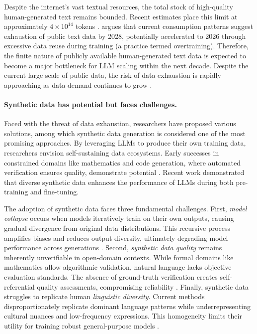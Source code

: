 Despite the internet's vast textual resources, the total stock of high-quality human-generated text remains bounded. Recent estimates place this limit at approximately {$4\times 10^{14}$ tokens} \cite{villalobos2022trends}. \citet{villalobos2024will} argues that current consumption patterns suggest exhaustion of public text data by 2028, potentially accelerated to 2026 through excessive data reuse during training (a practice termed {overtraining}). 
Therefore, the finite nature of publicly available human-generated text data is expected to become a major bottleneck for LLM scaling within the next decade. Despite the current large scale of public data, the risk of data exhaustion is rapidly approaching as data demand continues to grow \cite{sevilla2022compute}.

\paragraph{Synthetic data has potential but faces challenges.}
Faced with the threat of data exhaustion, researchers have proposed various solutions, among which synthetic data generation is considered one of the most promising approaches. 
By leveraging LLMs to produce their own training data, researchers envision {self-sustaining data ecosystems}. Early successes in constrained domains like mathematics and code generation, where automated verification ensures quality, demonstrate potential \cite{liu2023tinygsm}.  Recent work \cite{chen2024diversity} demonstrated that diverse synthetic data enhances the performance of LLMs during both pre-training and fine-tuning.


The adoption of synthetic data faces three fundamental challenges. First, \textit{model collapse} occurs when models iteratively train on their own outputs, causing gradual divergence from original data distributions. This recursive process amplifies biases and reduces output diversity, ultimately degrading model performance across generations \cite{shumailov2023curse,dohmatob2024strong}. 
Second, \textit{synthetic data quality} remains inherently unverifiable in open-domain contexts. While formal domains like mathematics allow algorithmic validation, natural language lacks objective evaluation standards. The absence of ground-truth verification creates self-referential quality assessments, compromising reliability \cite{alemohammad2023self,wenger2024ai}.
Finally, synthetic data struggles to replicate human \textit{linguistic diversity}. Current methods disproportionately replicate dominant language patterns while underrepresenting cultural nuances and low-frequency expressions. This homogeneity limits their utility for training robust general-purpose models \cite{fan2023scaling}.

